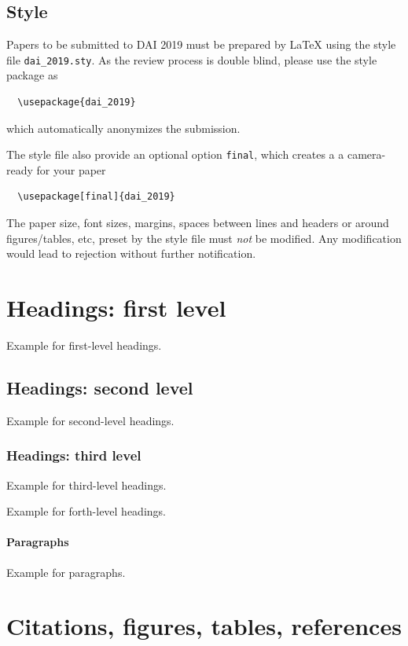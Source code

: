 \documentclass{article}
\begin{document}
\subsection{Style}

Papers to be submitted to DAI 2019 must be prepared by \LaTeX{} using the style 
file \verb+dai_2019.sty+. As the review process is double blind, please use the 
style package as 
\begin{verbatim}
  \usepackage{dai_2019}
\end{verbatim}
which automatically anonymizes the submission.

The style file also provide an optional option \verb+final+, which creates a 
a camera-ready for your paper
\begin{verbatim}
  \usepackage[final]{dai_2019}
\end{verbatim}

The paper size, font sizes, margins, spaces between lines and headers or around 
figures/tables, etc, preset by the style file must {\em not} be modified. Any 
modification would lead to rejection without further notification.

\section{Headings: first level}

Example for first-level headings.

\subsection{Headings: second level}

Example for second-level headings.

\subsubsection{Headings: third level}

Example for third-level headings.


Example for forth-level headings.

\paragraph{Paragraphs}

Example for paragraphs.

\section{Citations, figures, tables, references}
\end{document}
